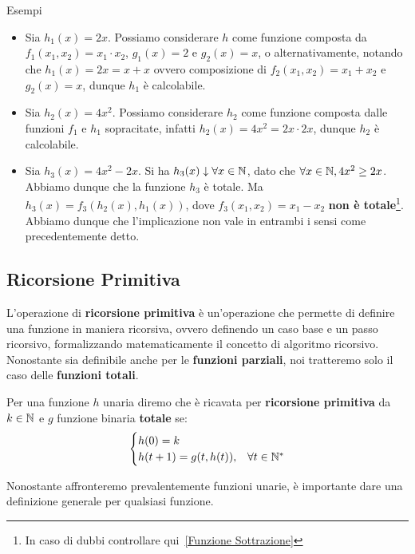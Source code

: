 \begin{generalbox}[colframe=azure-gradient-3!90!black]{Esempi}
  \begin{itemize}
    \item Sia \(h_1(x)=2x\). Possiamo considerare \(h\) come funzione composta da \(f_1(x_1, x_2)=x_1 \cdot x_2\), \(g_1(x)=2\) e \(g_2(x)=x\), o alternativamente, notando che \(h_1(x)=2x=x+x\) ovvero composizione di \(f_2(x_1,x_2)=x_1+x_2\) e \(g_2(x)=x\), dunque \(h_1\) è calcolabile.
    \item Sia \(h_2(x)=4x^2\). Possiamo considerare \(h_2\) come funzione composta dalle funzioni \(f_1\) e \(h_1\) sopracitate, infatti \(h_2(x)=4x^2=2x\cdot 2x\), dunque \(h_2\) è calcolabile.
    \item Sia \(h_3(x)=4x^2-2x\). Si ha \(h_3(x)\downarrow \forall x \in \mathbb{N}\), dato che \(\forall x \in \mathbb{N}, 4x^2 \geq 2x\). Abbiamo dunque che la funzione \(h_3\) è totale. Ma \(h_3(x)=f_3(h_2(x),h_1(x))\), dove \(f_3(x_1,x_2)=x_1-x_2\) \textbf{non è totale}\footnote{In caso di dubbi controllare qui~\ref{Funzione Sottrazione}}. Abbiamo dunque che l'implicazione non vale in entrambi i sensi come precedentemente detto.
  \end{itemize}
\end{generalbox}

\subsection{Ricorsione Primitiva}

L'operazione di \textbf{ricorsione primitiva} è un'operazione che permette di definire una funzione in maniera ricorsiva, ovvero definendo un caso base e un passo ricorsivo, formalizzando matematicamente il concetto di algoritmo ricorsivo.
Nonostante sia definibile anche per le \textbf{funzioni parziali}, noi tratteremo solo il caso delle \textbf{funzioni totali}.

Per una funzione \(h\) unaria diremo che è ricavata per \textbf{ricorsione primitiva} da \(k\in\mathbb{N}\) e \(g\) funzione binaria \textbf{totale} se:
\begin{equation}
  \begin{cases}
    h(0)=k\\
    h(t+1)=g(t,h(t)), & \forall t\in\mathbb{N}^*
  \end{cases}
\end{equation}

Nonostante affronteremo prevalentemente funzioni unarie, è importante dare una definizione generale per qualsiasi funzione.

